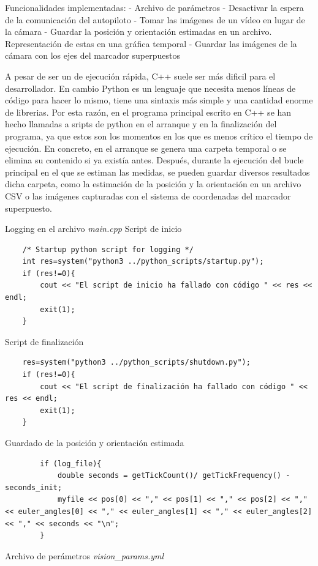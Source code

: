 Funcionalidades implementadas:
- Archivo de parámetros
- Desactivar la espera de la comunicación del autopiloto
- Tomar las imágenes de un vídeo en lugar de la cámara
- Guardar la posición y orientación estimadas en un archivo. Representación de estas en una gráfica temporal
- Guardar las imágenes de la cámara con los ejes del marcador superpuestos  


A pesar de ser un de ejecución rápida, C++ suele ser más dificil para el desarrollador. En cambio Python es un lenguaje que necesita menos líneas de código para hacer lo mismo, tiene una sintaxis más simple y una cantidad enorme de librerias. Por esta razón, en el programa principal escrito en C++ se han hecho llamadas a sripts de python en el arranque y en la finalización del programa, ya que estos son los momentos en los que es menos crítico el tiempo de ejecución. En concreto, en el arranque se genera una carpeta temporal o se elimina su contenido si ya existía antes. Después, durante la ejecución del bucle principal en el que se estiman las medidas, se pueden guardar diversos resultados dicha carpeta, como la estimación de la posición y la orientación en un archivo CSV o las imágenes capturadas con el sistema de coordenadas del marcador superpuesto.  

\begin{codigo}{Logging en el archivo \textit{main.cpp}}
\label{cod:invPX4}
Script de inicio
\begin{verbatim}
    /* Startup python script for logging */
    int res=system("python3 ../python_scripts/startup.py");
    if (res!=0){
        cout << "El script de inicio ha fallado con código " << res << endl;
        exit(1);
    }
\end{verbatim}
Script de finalización
\begin{verbatim}
    res=system("python3 ../python_scripts/shutdown.py");
    if (res!=0){
        cout << "El script de finalización ha fallado con código " << res << endl;
        exit(1);
    }
\end{verbatim}
Guardado de la posición y orientación estimada
\begin{verbatim}
        if (log_file){
            double seconds = getTickCount()/ getTickFrequency() - seconds_init;
            myfile << pos[0] << "," << pos[1] << "," << pos[2] << "," << euler_angles[0] << "," << euler_angles[1] << "," << euler_angles[2] << "," << seconds << "\n";
        }
\end{verbatim}
\end{codigo} 


\begin{codigo}{Archivo de perámetros \textit{vision\_params.yml}}
\label{cod:params}
\inputminted{yaml}{posicionamiento_marcadores/vision_params.yml}
\end{codigo} 



\endinput
